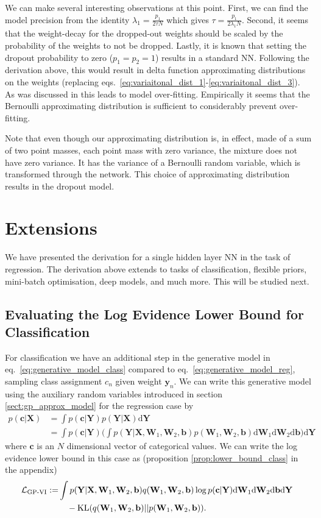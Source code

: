 \documentclass{article} %
\newcommand{\cL}{\mathcal{L}}
\newcommand{\td}{\text{d}}
\newcommand{\Bb}{\mathbf{b}}
\newcommand{\y}{\mathbf{y}}
\newcommand{\W}{\mathbf{W}}
\newcommand{\X}{\mathbf{X}}
\newcommand{\Y}{\mathbf{Y}}
\newcommand{\KL}{\text{KL}}
\newcommand{\bc}{\mathbf{c}}
\newcommand{\weightdecay}{\lambda}
\theoremstyle{definition}
\begin{document}
We can make several interesting observations at this point. First, we can find the model precision from the identity $\weightdecay_1 = \frac{p_1}{2 \tau N}$ which gives $\tau = \frac{p_1}{2 \weightdecay_1 N}$. Second, it seems that the weight-decay for the dropped-out weights should be scaled by the probability of the weights to not be dropped. Lastly, it is known that setting the dropout probability to zero ($p_1 = p_2 = 1$) results in a standard NN. Following the derivation above, this would result in delta function approximating distributions on the weights (replacing eqs.\ \eqref{eq:variaitonal_dist_1}-\eqref{eq:variaitonal_dist_3}). As was discussed in \citep{lazaro2010sparse} this leads to model over-fitting. Empirically it seems that the Bernoulli approximating distribution is sufficient to considerably prevent over-fitting. 

Note that even though our approximating distribution is, in effect, made of a sum of two point masses, each point mass with zero variance, the mixture does not have zero variance. It has the variance of a Bernoulli random variable, which is transformed through the network. This choice of approximating distribution results in the dropout model.

\section{Extensions}

We have presented the derivation for a single hidden layer NN in the task of regression. The derivation above extends to tasks of classification, flexible priors, mini-batch optimisation, deep models, and much more. This will be studied next.

\subsection{Evaluating the Log Evidence Lower Bound for Classification} \label{sect:classification}
For classification we have an additional step in the generative model in eq.\ \eqref{eq:generative_model_class} compared to eq.\ \eqref{eq:generative_model_reg}, sampling class assignment $c_n$ given weight $\y_n$. We can write this generative model using the auxiliary random variables introduced in section \ref{sect:gp_approx_model} for the regression case by
\begin{align*}
p(\bc | \X) &= \int p(\bc | \Y) p(\Y | \X) \td \Y \\
&= \int p(\bc | \Y) \bigg( \int p(\Y | \X, \W_1, \W_2, \Bb) p(\W_1, \W_2, \Bb) \td \W_1 \td \W_2 \td \Bb \bigg) \td \Y
\end{align*}
where $\bc$ is an $N$ dimensional vector of categorical values.
We can write the log evidence lower bound in this case as (proposition \ref{prop:lower_bound_class} in the appendix)
\begin{align*}
\hspace{-1mm}
\cL_{\text{GP-VI}} := &\int p(\Y|\X, \W_1, \W_2, \Bb) q(\W_1, \W_2, \Bb) \log p(\bc | \Y) \td \W_1 \td \W_2 \td \Bb \td \Y  \notag\\
&\quad - \KL(q(\W_1, \W_2, \Bb) || p(\W_1, \W_2, \Bb)).
\end{align*}
\end{document}
